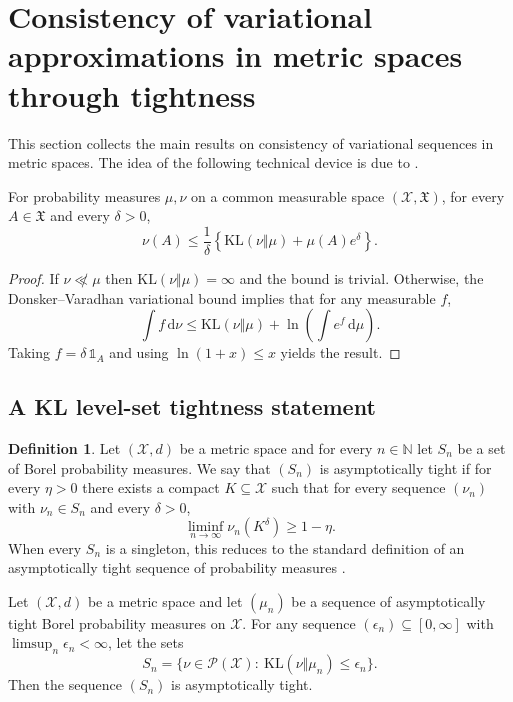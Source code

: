 \documentclass[11pt]{article}
\theoremstyle{plain}
\theoremstyle{definition}
\newtheorem{definition}{Definition}
\theoremstyle{remark}
\begin{document}
\section{Consistency of variational approximations in metric spaces through tightness}
\label{sec:metric-space}

This section collects the main results on consistency of variational sequences in metric spaces. The idea of the following technical device is due to \citet{RaySzabo2022VBHDLR}.

\begin{lem}\label{lem:j:1}
For probability measures $\mu,\nu$ on a common measurable space $(\mathcal{X},\mathfrak X)$, for every $A\in\mathfrak X$ and every $\delta>0$,
\[
\nu(A) \le \frac{1}{\delta}\left\{\mathrm{KL}(\nu\Vert\mu) + \mu(A) e^{\delta}\right\}.
\]
\end{lem}

\begin{proof}
If $\nu\not\ll \mu$ then $\mathrm{KL}(\nu\Vert\mu)=\infty$ and the bound is trivial.
Otherwise, the Donsker--Varadhan variational bound \cite[Thm. 4.6]{polyanskiy_wu_2025_information_theory} implies that for any measurable $f$,
\[
\int f\,\mathrm{d}\nu \le \mathrm{KL}(\nu\Vert\mu) + \ln\left(\int e^{f}\,\mathrm{d}\mu\right).
\]
Taking $f=\delta\,\mathds{1}_A$ and using $\ln(1+x)\le x$ yields the result.
\end{proof}

\subsection{A KL level-set tightness statement}



\begin{definition}
    Let $(\mathcal X,d)$ be a metric space and for every $n\in \mathbb N$ let $S_n$ be a set of Borel probability measures.
    We say that $(S_n)$ is asymptotically tight if for every $\eta>0$ there exists a compact $K\subseteq\mathcal X$ such that for every sequence $(\nu_n)$ with $\nu_n\in S_n$ and every $\delta>0$,
    \[
    \liminf_{n\to\infty}\nu_n(K^\delta)\ge 1-\eta.
    \]
    When every $S_n$ is a singleton, this reduces to the standard definition of an asymptotically tight sequence of probability measures \cite[Def 1.3.7]{vaart2023empirical}.
\end{definition}

\begin{thm}\label{thm:metric:asympt-tight}
Let $(\mathcal X,d)$ be a metric space and let $(\mu_n)$ be a sequence of asymptotically tight Borel probability measures on $\mathcal X$.
For any sequence $(\epsilon_n)\subseteq [0,\infty]$ with $\limsup_n \epsilon_n<\infty$, let the sets
\[
S_n=\{\nu\in\mathcal P(\mathcal X):\ \mathrm{KL}(\nu\Vert\mu_n)\le \epsilon_n\}.
\]
Then the sequence $(S_n)$ is asymptotically tight.
\end{thm}
\end{document}

